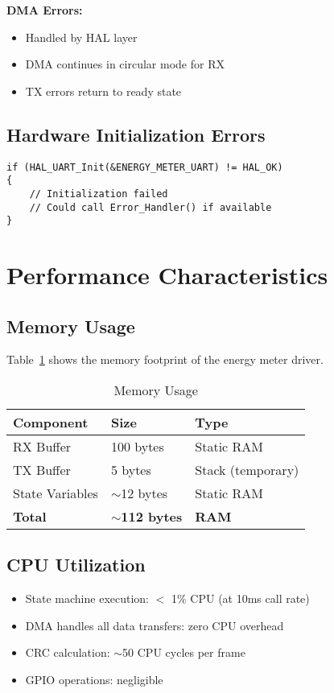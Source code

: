 \documentclass[11pt,a4paper]{article}
\begin{document}
\textbf{DMA Errors:}
\begin{itemize}[noitemsep]
    \item Handled by HAL layer
    \item DMA continues in circular mode for RX
    \item TX errors return to ready state
\end{itemize}

\subsection{Hardware Initialization Errors}

\begin{lstlisting}
if (HAL_UART_Init(&ENERGY_METER_UART) != HAL_OK)
{
    // Initialization failed
    // Could call Error_Handler() if available
}
\end{lstlisting}

\section{Performance Characteristics}

\subsection{Memory Usage}

Table~\ref{tab:memory} shows the memory footprint of the energy meter driver.

\begin{table}[H]
\centering
\begin{tabular}{lll}
\toprule
\textbf{Component} & \textbf{Size} & \textbf{Type} \\
\midrule
RX Buffer & 100 bytes & Static RAM \\
TX Buffer & 5 bytes & Stack (temporary) \\
State Variables & $\sim$12 bytes & Static RAM \\
\textbf{Total} & \textbf{$\sim$112 bytes} & \textbf{RAM} \\
\bottomrule
\end{tabular}
\caption{Memory Usage}
\label{tab:memory}
\end{table}

\subsection{CPU Utilization}

\begin{itemize}[noitemsep]
    \item State machine execution: $<$ 1\% CPU (at 10ms call rate)
    \item DMA handles all data transfers: zero CPU overhead
    \item CRC calculation: $\sim$50 CPU cycles per frame
    \item GPIO operations: negligible
\end{itemize}
\end{document}
